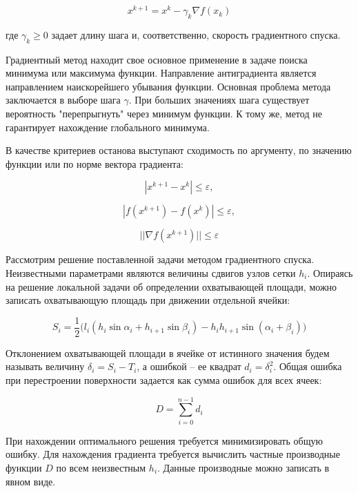 \documentclass[
11pt,%
tightenlines,%
twoside,%
onecolumn,%
nofloats,%
nobibnotes,%
nofootinbib,%
superscriptaddress,%
noshowpacs,%
centertags]%
{revtex4}
\begin{document}
\begin{equation}
x^{k+1} = x^k - \gamma _k \nabla f(x_k)
\end{equation}

где $\gamma _k \geq 0$ задает длину шага и, соответственно, скорость градиентного спуска.

Градиентный метод находит свое основное применение в задаче поиска минимума или максимума функции.
Направление антиградиента является направлением наискорейшего убывания функции.
Основная проблема метода заключается в выборе шага $\gamma$.
При больших значениях шага существует вероятность "перепрыгнуть" через минимум функции.
К тому же, метод не гарантирует нахождение глобального минимума.

В качестве критериев останова выступают сходимость по аргументу, по значению функции или по норме вектора градиента:

\begin{equation}
|x^{k+1} - x^k| \leq \varepsilon,
\end{equation}

\begin{equation}
|f(x^{k+1})- f(x^k)| \leq \varepsilon,
\end{equation}

\begin{equation}
||\nabla f(x^{k+1})|| \leq \varepsilon
\end{equation}

Рассмотрим решение поставленной задачи методом градиентного спуска.
Неизвестными параметрами являются величины сдвигов узлов сетки $h_i$.
Опираясь на решение локальной задачи об определении охватывающей площади, можно записать охватывающую площадь при движении отдельной ячейки:

\begin{equation}
S_i = \frac{1}{2}\big(l_i(h_i \sin \alpha_i + h_{i + 1} \sin \beta_i) - h_ih_{i + 1} \sin(\alpha_i + \beta_i)\big) 
\end{equation}

Отклонением охватывающей площади в ячейке от истинного значения будем называть величину $\delta_i = S_i - T_i$, а ошибкой -- ее квадрат $d_i = \delta_i^2$.
Общая ошибка при перестроении поверхности задается как сумма ошибок для всех ячеек:

\begin{equation}
D = \sum_{i = 0}^{n - 1}{d_i}
\end{equation}

При нахождении оптимального решения требуется минимизировать общую ошибку.
Для нахождения градиента требуется вычислить частные производные функции $D$ по всем неизвестным $h_i$.
Данные производные можно записать в явном виде.
\end{document}
